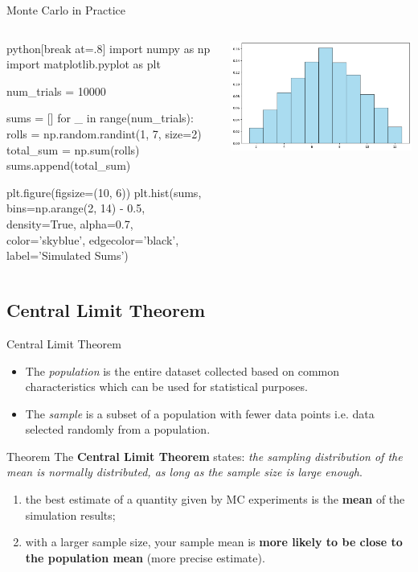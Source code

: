 \documentclass{beamer}
\begin{document}
\begin{frame}[fragile]{Monte Carlo in Practice}
\begin{columns}
\begin{mintedbox}{python}[break at=.8\textheight]
import numpy as np
import matplotlib.pyplot as plt

num_trials = 10000

sums = []
for _ in range(num_trials):
    rolls = np.random.randint(1, 7, size=2)
    total_sum = np.sum(rolls)
    sums.append(total_sum)

plt.figure(figsize=(10, 6))
plt.hist(sums, bins=np.arange(2, 14) - 0.5, density=True, alpha=0.7, 
         color='skyblue', edgecolor='black', label='Simulated Sums')
\end{mintedbox}
    \includegraphics[width=0.8\linewidth]{images/sum_two_dice}
\end{columns}
\end{frame}

\subsection{Central Limit Theorem}
\begin{frame}{Central Limit Theorem}
\begin{itemize}
\item The \emph{population} is the entire dataset collected based on common characteristics which can be used for statistical purposes.
\item The \emph{sample} is a subset of a population with fewer data points i.e. data selected randomly from a population.
\end{itemize}
\begin{block}{Theorem}
The \textbf{Central Limit Theorem} states: \emph{the sampling distribution of the mean is normally distributed, as long as the sample size is large enough}.
	
\begin{enumerate}
    \item the best estimate of a quantity given by MC experiments is the \textbf{mean} of the simulation results;
    \item with a larger sample size, your sample mean is \textbf{more likely to be close to the population mean} (more precise estimate).
\end{enumerate}
\end{block}
\end{frame}
\end{document}
